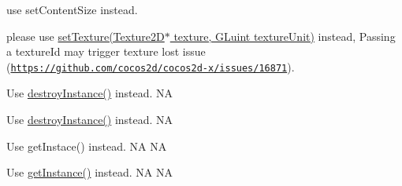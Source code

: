 \begin{DoxyRefList}
use {\ttfamily set\+Content\+Size} instead.  
\item[\label{deprecated__deprecated000365}%
\Hypertarget{deprecated__deprecated000365}%
Member \hyperlink{classUniformValue_ad8c2b6a8a18332ac20051e29a4ac72c6}{Uniform\+Value\+:\+:set\+Texture} (G\+Luint texture\+Id, G\+Luint texture\+Unit)]please use \hyperlink{classUniformValue_ad55812685ddc1cc858ada0cf5fe2afaf}{set\+Texture(\+Texture2\+D$\ast$ texture, G\+Luint texture\+Unit)} instead, Passing a {\ttfamily texture\+Id} may trigger texture lost issue (\href{https://github.com/cocos2d/cocos2d-x/issues/16871}{\tt https\+://github.\+com/cocos2d/cocos2d-\/x/issues/16871}).  
\item[\label{deprecated__deprecated000061}%
\Hypertarget{deprecated__deprecated000061}%
Member \hyperlink{classUserDefault_adef2a718311ba39ea072abd617e3750c}{User\+Default\+:\+:purge\+Shared\+User\+Default} ()]Use \hyperlink{classUserDefault_abaf8b97d4b852484a503eb41e6bfb1ae}{destroy\+Instance()} instead.  NA 

Use \hyperlink{classUserDefault_abaf8b97d4b852484a503eb41e6bfb1ae}{destroy\+Instance()} instead.  NA  
\item[\label{deprecated__deprecated000060}%
\Hypertarget{deprecated__deprecated000060}%
Member \hyperlink{classUserDefault_ad47d1595d50f32eb7805fd36dd844b38}{User\+Default\+:\+:shared\+User\+Default} ()]Use get\+Instace() instead.  NA  NA 

Use \hyperlink{classUserDefault_a0885d10cb5187584d49d245594a43b8c}{get\+Instance()} instead.  NA  NA 
\end{DoxyRefList}